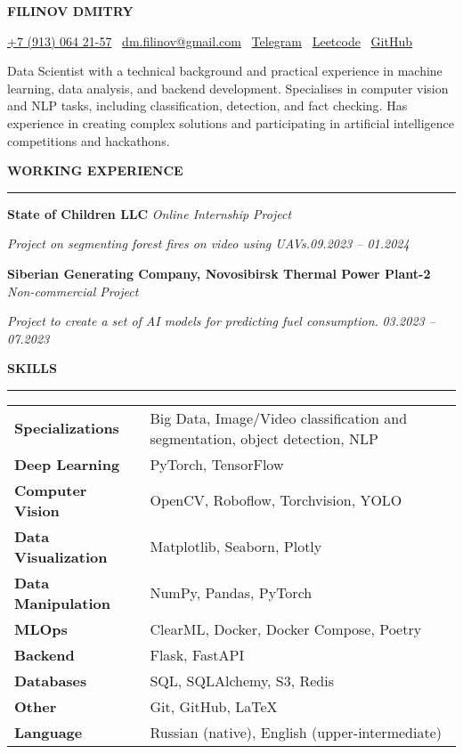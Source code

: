 \documentclass[10pt,a4paper]{article}
\newcommand{\sechead}[1]{%
  \noindent\textbf{#1}\par
  \vspace{-8pt}
  \noindent\rule{\linewidth}{0.4pt}\par\vspace{0.1cm}
}
\begin{document}
\begin{center}
  {\huge\rmfamily\bfseries FILINOV DMITRY}
\end{center}
\begin{center}
\href{tel:+79130642157}{+7 (913) 064 21-57} \textbar\ 
\href{mailto:dm.filinov@gmail.com}{dm.filinov@gmail.com} \textbar\
  \href{https://t.me/D1ffic00lt}{Telegram} \textbar\ 
  \href{https://leetcode.com/u/D1ffic00lt/}{Leetcode} \textbar\ 
  \href{https://github.com/D1ffic00lt}{GitHub}
\end{center}
Data Scientist with a technical background and practical experience in machine learning, data analysis, and backend development. Specialises in computer vision and NLP tasks, including classification, detection, and fact checking. Has experience in creating complex solutions and participating in artificial intelligence competitions and hackathons.
\vspace{0.3cm}

\sechead{WORKING EXPERIENCE}

\textbf{State of Children LLC} \hfill \emph{Online Internship Project}

	\textit{Project on segmenting forest fires on video using UAVs.}\hfill \emph{09.2023 – 01.2024}\vspace{0.2cm}
	
	\textbf{Siberian Generating Company, Novosibirsk Thermal Power Plant-2} \hfill \emph{Non-commercial Project}
	
\textit{Project to create a set of AI models for predicting fuel consumption.} \hfill \emph{03.2023 – 07.2023}\vspace{0.2cm}

\vspace{0.3cm}

\sechead{SKILLS}

\begin{tabular}{@{}l p{0.75\textwidth\qquad}@{}}
\textbf{Specializations} & Big Data, Image/Video classification and segmentation, object detection, NLP \\
\textbf{Deep Learning}   & PyTorch, TensorFlow \\
\textbf{Computer Vision}& OpenCV, Roboflow, Torchvision, YOLO \\
\textbf{Data Visualization}& Matplotlib, Seaborn, Plotly \\
\textbf{Data Manipulation}& NumPy, Pandas, PyTorch \\
\textbf{MLOps}           & ClearML, Docker, Docker Compose, Poetry \\
\textbf{Backend}         & Flask, FastAPI \\
\textbf{Databases}       & SQL, SQLAlchemy, S3, Redis \\
\textbf{Other}           & Git, GitHub, \LaTeX \\
\textbf{Language}&Russian (native), English (upper-intermediate)
\end{tabular}
\vspace{0.3cm}
\end{document}
